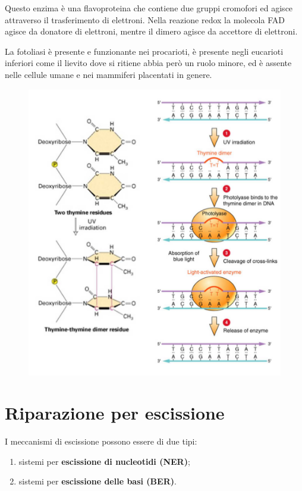 \documentclass[11pt]{book}
\begin{document}
Questo enzima è una flavoproteina che contiene due gruppi cromofori ed
agisce attraverso il trasferimento di elettroni. Nella reazione redox la
molecola FAD agisce da donatore di elettroni, mentre il dimero agisce da
accettore di elettroni.

La fotoliasi è presente e funzionante nei procarioti, è presente negli
eucarioti inferiori come il lievito dove si ritiene abbia però un ruolo
minore, ed è assente nelle cellule umane e nei mammiferi placentati in
genere.

\begin{figure}[htp]
\centering
\includegraphics[scale=0.7]{img/23_Fotoliasi.png}
\caption{}
\label{fotoliasi}
\end{figure}

\clearpage
\section{Riparazione per
escissione}\label{riparazione-per-escissione}

I meccanismi di escissione possono essere di due tipi:
\vspace*{-5mm}
\begin{enumerate}
\def\labelenumi{\arabic{enumi}.}
\itemsep1pt\parskip0pt
\item
  sistemi per \textbf{escissione di nucleotidi (NER)};
\item
  sistemi per \textbf{escissione delle basi (BER)}.
\end{enumerate}
\end{document}
